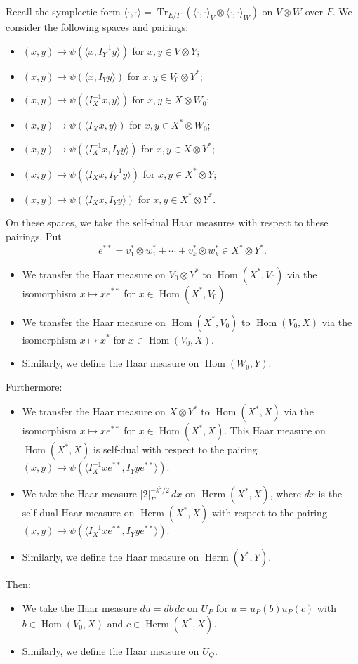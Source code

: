 \documentclass[11pt]{amsart}
\numberwithin{equation}{section}
\theoremstyle{plain}
\theoremstyle{definition}
\theoremstyle{remark}
\def\Herm{\operatorname{Herm}}
\def\Hom{\operatorname{Hom}}
\def\Tr{\operatorname{Tr}}
\begin{document}
Recall the symplectic form
$\langle \cdot, \cdot \rangle = \Tr_{E/F}(\langle \cdot, \cdot \rangle_V \otimes \langle \cdot, \cdot \rangle_W)$ on $V \otimes W$ over $F$.
We consider the following spaces and pairings:
\begin{itemize}
 \item $(x, y) \mapsto \psi(\langle x, I_Y^{-1} y \rangle)$
 for $x, y \in V \otimes Y$;
 \item $(x, y) \mapsto \psi(\langle x, I_Y y \rangle)$
 for $x, y \in V_0 \otimes Y^*$;
 \item $(x, y) \mapsto \psi(\langle I_X^{-1} x, y \rangle)$
 for $x, y \in X \otimes W_0$;
 \item $(x, y) \mapsto \psi(\langle I_X x, y \rangle)$
 for $x, y \in X^* \otimes W_0$; 
 \item $(x, y) \mapsto \psi(\langle I_X^{-1} x, I_Y y \rangle)$
 for $x, y \in X \otimes Y^*$; 
 \item $(x, y) \mapsto \psi(\langle I_X x, I_Y^{-1} y \rangle)$
 for $x, y \in X^* \otimes Y$; 
 \item $(x, y) \mapsto \psi(\langle I_X x, I_Y y \rangle)$
 for $x, y \in X^* \otimes Y^*$. 
\end{itemize}
On these spaces, we take the self-dual Haar measures with respect to these pairings.
Put
\[
  e^{**} = v^*_1 \otimes w^*_1 + \cdots + v_k^* \otimes w^*_k \in X^* \otimes Y^*.
\]
\begin{itemize}
 \item We transfer the Haar measure on $V_0 \otimes Y^*$ to $\Hom(X^*, V_0)$ via the isomorphism $x \mapsto x e^{**}$ for $x \in \Hom(X^*, V_0)$.
 \item We transfer the Haar measure on $\Hom(X^*,V_0)$ to $\Hom(V_0, X)$ via the isomorphism $x \mapsto x^*$ for $x \in \Hom(V_0, X)$.
 \item Similarly, we define the Haar measure on $\Hom(W_0, Y)$.
\end{itemize}
Furthermore:
\begin{itemize}
 \item We transfer the Haar measure on $X \otimes Y^*$ to $\Hom(X^*, X)$ via the isomorphism $x \mapsto x e^{**}$ for $x \in \Hom(X^*, X)$. This Haar measure on $\Hom(X^*, X)$ is self-dual with respect to the pairing
$(x, y) \mapsto \psi(\langle I_X^{-1} x e^{**}, I_Y y e^{**} \rangle)$.
 \item We take the Haar measure $|2|_F^{-k^2/2} \, dx$ on $\Herm(X^*,X)$, where $dx$ is the self-dual Haar measure on $\Herm(X^*,X)$ with respect to the pairing
$(x, y) \mapsto \psi(\langle I_X^{-1} x e^{**}, I_Y y e^{**} \rangle)$.
 \item Similarly, we define the Haar measure on $\Herm(Y^*, Y)$.
\end{itemize}
Then: 
\begin{itemize}
 \item We take the Haar measure $du = db \, dc$ on $U_P$ for $u = u_P(b) u_P(c)$ with $b \in \Hom(V_0,X)$ and $c \in \Herm(X^*,X)$.
 \item Similarly, we define the Haar measure on $U_Q$.
\end{itemize}
\end{document}
